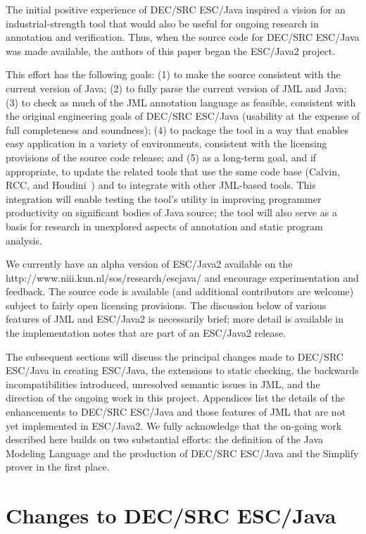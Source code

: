 \documentclass{llncs}
\begin{document}
The initial positive experience of DEC/SRC ESC/Java inspired a vision
for an industrial-strength tool that would also be useful for ongoing
research in annotation and verification.  Thus, when the source code
for DEC/SRC ESC/Java was made available, the authors of this paper
began the ESC/Java2 project.

This effort has the following goals:
(1) to make the source consistent with the current version of Java;
(2) to fully parse the current version of JML and Java;
(3) to check as much of the JML annotation language as feasible,
consistent with the original engineering goals of DEC/SRC ESC/Java
(usability at the expense of full completeness and soundness); 
(4) to package the tool in a way that enables easy application in a
variety of environments, consistent with the licensing provisions of
the source code release;
and
(5) as a long-term goal, and if appropriate, to update the related
tools that use the same code base (Calvin, RCC, and
Houdini~\cite{flanagan01houdini}) and to integrate with other
JML-based tools.  This integration will enable testing the tool's
utility in improving programmer productivity on significant bodies of
Java source; the tool will also serve as a basis for research in
unexplored aspects of annotation and static program analysis.
  
We currently have an alpha version of ESC/Java2 available on the
{http://www.niii.kun.nl/sos/research/escjava/} and encourage
experimentation and feedback.  The source code is available (and
additional contributors are welcome) subject to fairly open licensing
provisions.  The discussion below of various features of JML and
ESC/Java2 is necessarily brief; more detail is available in the
implementation notes that are part of an ESC/Java2 release.

The subsequent sections will discuss the principal changes made to
DEC/SRC ESC/Java in creating ESC/Java, the extensions to static
checking, the backwards incompatibilities introduced, unresolved
semantic issues in JML, and the direction of the ongoing work in this
project.  Appendices list the details of the enhancements to DEC/SRC
ESC/Java and those features of JML that are not yet implemented in
ESC/Java2.  We fully acknowledge that the on-going work described here
builds on two substantial efforts: the definition of the Java Modeling
Language and the production of DEC/SRC ESC/Java and the Simplify
prover in the first place.

\section{Changes to DEC/SRC ESC/Java}
\end{document}
